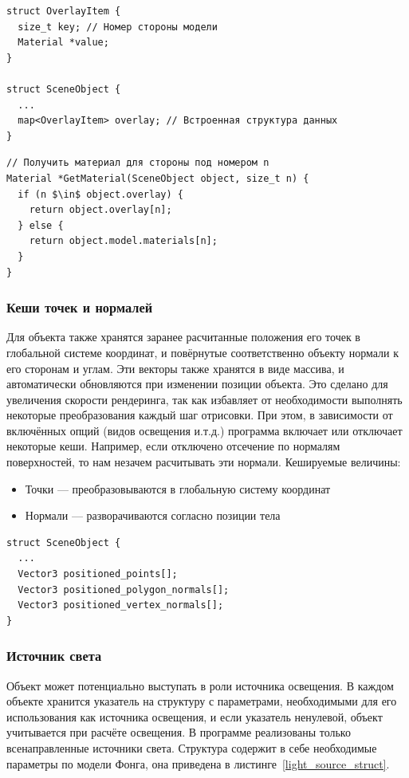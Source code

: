 \documentclass[a4paper,12pt]{report}
\numberwithin{equation}{section}
\begin{document}
\begin{lstlisting}[float=h,caption={Структура данных ``Оверлей материалов''},label=overlay_struct]
struct OverlayItem {
  size_t key; // Номер стороны модели
  Material *value;
}

struct SceneObject {
  ...
  map<OverlayItem> overlay; // Встроенная структура данных
}
\end{lstlisting}

\begin{lstlisting}[float=h,caption={Использование оверлея},label=overlay_use]
// Получить материал для стороны под номером n
Material *GetMaterial(SceneObject object, size_t n) {
  if (n $\in$ object.overlay) {
    return object.overlay[n];
  } else {
    return object.model.materials[n];
  }
}
\end{lstlisting}

\subsubsection{Кеши точек и нормалей}
Для объекта также хранятся заранее расчитанные положения его точек в глобальной системе координат, и повёрнутые соответственно объекту нормали к его сторонам и углам. Эти векторы также хранятся в виде массива, и автоматически обновляются при изменении позиции объекта. Это сделано для увеличения скорости рендеринга, так как избавляет от необходимости выполнять некоторые преобразования каждый шаг отрисовки. При этом, в зависимости от включённых опций (видов освещения и.т.д.) программа включает или отключает некоторые кеши. Например, если отключено отсечение по нормалям поверхностей, то нам незачем расчитывать эти нормали. Кешируемые величины:
\begin{itemize}
\item Точки --- преобразовываются в глобальную систему координат
\item Нормали --- разворачиваются согласно позиции тела
\end{itemize}

\begin{lstlisting}[float=h,caption={Поля кеша в структуре ``Объект на сцене''},label=object_cache_struct]
struct SceneObject {
  ...
  Vector3 positioned_points[];
  Vector3 positioned_polygon_normals[];
  Vector3 positioned_vertex_normals[];
}
\end{lstlisting}

\subsubsection{Источник света}
Объект может потенциально выступать в роли источника освещения. В каждом объекте хранится указатель на структуру с параметрами, необходимыми для его использования как источника освещения, и если указатель ненулевой, объект учитывается при расчёте освещения. В программе реализованы только всенаправленные источники света. Структура содержит в себе необходимые параметры по модели Фонга, она приведена в листинге~\ref{light_source_struct}.
\end{document}

